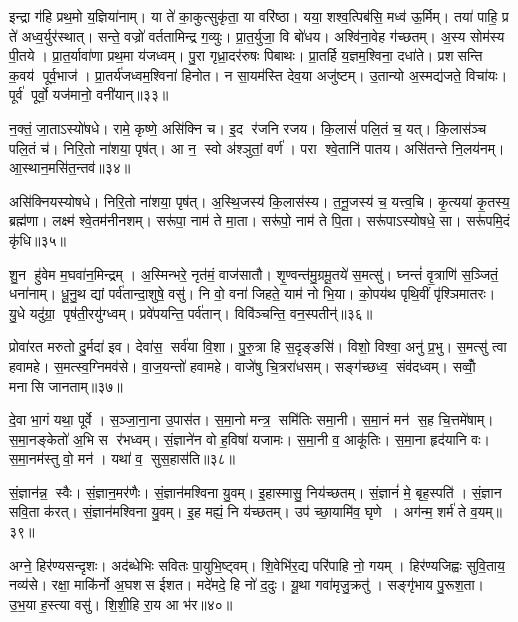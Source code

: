 इन्द्रा ग॑हि प्रथ॒मो य॒ज्ञिया॑नाम्।
या ते॑ का॒कुत्सुकृ॑ता॒ या वरि॑ष्ठा।
यया॒ शश्व॒त्पिब॑सि॒ मध्व॑ ऊ॒र्मिम्।
तया॑ पाहि॒ प्र ते॑ अध्व॒र्युर॑स्थात्।
सन्ते॒ वज्रो॑ वर्ततामिन्द्र ग॒व्युः।
प्रा॒त॒र्युजा॒ वि बो॑धय।
अश्वि॑ना॒वेह ग॑च्छतम्।
अ॒स्य सोम॑स्य पी॒तये।
प्रा॒त॒र्यावा॑णा प्रथ॒मा य॑जध्वम्।
पु॒रा गृध्रा॒दर॑रुषः पिबाथः।
प्रा॒तर्\mbox{}हि य॒ज्ञम॒श्विना॒ दधा॑ते।
प्रशसन्ति क॒वय॑ पूर्व॒भाज॑।
प्रा॒तर्य॑जध्वम॒श्विना॑ हिनोत।
न सा॒यम॑स्ति देव॒या अजु॑ष्टम्।
उ॒तान्यो अ॒स्मद्य॑जते॒ विचा॑यः।
पूर्व॑ पूर्वो॒ यज॑मानो॒ वनी॑यान्॥३३॥\anuvakamend[चा॒श्व॒जिद्यो ग॑च्छतं नो॒ दाश॒न्नामा॑भि॒श्रीर्ग॑मेम स॒प्रथा॑ भजामहे विशन्तु या॒ह्य॑र्वाङच्छ॑ पिबाथ॒ष्षट्च॑]

न॒क्तं॒ जा॒ताऽस्यो॑षधे।
रामे॒ कृष्णे॒ असि॑क्नि च।
इ॒द र॑जनि रजय।
कि॒लासं॑ पलि॒तं च॒ यत्।
कि॒लास॑ञ्च पलि॒तं च॑।
निरि॒तो ना॑शया॒ पृष॑त्।
आ न॒ स्वो अ॑श्ञुतां॒ वर्ण॑।
परा श्वे॒तानि॑ पातय।
असि॑तन्ते नि॒लय॑नम्।
आ॒स्थान॒मसि॑त॒न्तव॑॥३४॥

असि॑क्नियस्योषधे।
निरि॒तो ना॑शया॒ पृष॑त्।
अ॒स्थि॒जस्य॑ कि॒लास॑स्य।
त॒नू॒जस्य॑ च॒ यत्त्व॒चि।
कृ॒त्यया॑ कृ॒तस्य॒ ब्रह्म॑णा।
लक्ष्म॑ श्वे॒तम॑नीनशम्।
सरू॑पा॒ नाम॑ ते मा॒ता।
सरू॑पो॒ नाम॑ ते पि॒ता।
सरू॑पाऽस्योषधे॒ सा।
सरू॑पमि॒दं कृ॑धि॥३५॥

शु॒न हु॑वेम म॒घवा॑न॒मिन्द्रम्।
अ॒स्मिन्भरे॒ नृत॑मं॒ वाज॑सातौ।
शृ॒ण्वन्त॑मु॒ग्रमू॒तये॑ स॒मत्सु॑।
घ्नन्तं॑ वृ॒त्राणि॑ स॒ञ्जितं॒ धना॑नाम्।
धू॒नु॒थ द्यां पर्व॑तान्दा॒शुषे॒ वसु॑।
नि वो॒ वना॑ जिहते॒ याम॑ नो भि॒या।
को॒पय॑थ पृथि॒वीं पृ॑श्ञिमातरः।
यु॒धे यदु॑ग्रा॒ पृष॑ती॒रयु॑ग्ध्वम्।
प्रवे॑पयन्ति॒ पर्व॑तान्।
विवि॑ञ्चन्ति॒ वन॒स्पतीन्॑॥३६॥

प्रोवा॑रत मरुतो दु॒र्मदा॑ इव।
देवा॑स॒ सर्व॑या वि॒शा।
पु॒रु॒त्रा हि स॒दृङ्ङसि॑।
विशो॒ विश्वा॒ अनु॑ प्र॒भु।
स॒मत्सु॑ त्वा हवामहे।
स॒मत्स्व॒ग्निमव॑से।
वा॒ज॒यन्तो॑ हवामहे।
वाजे॑षु चि॒त्ररा॑धसम्।
सङ्ग॑च्छध्व॒ संव॑दध्वम्।
सव्वोँ॒ मनासि जानताम्॥३७॥

दे॒वा भा॒गं यथा॒ पूर्वे।
स॒ञ्जा॒ना॒ना उ॒पास॑त।
स॒मा॒नो मन्त्र॒ समि॑तिः समा॒नी।
स॒मा॒नं मन॑ स॒ह चि॒त्तमे॑षाम्।
स॒मा॒नङ्केतो॑ अ॒भि स र॑भध्वम्।
सं॒ज्ञाने॑न वो ह॒विषा॑ यजामः।
स॒मा॒नी व॒ आकू॑तिः।
स॒मा॒ना हृद॑यानि वः।
स॒मा॒नम॑स्तु वो॒ मन॑।
यथा॑ व॒ सुस॒हास॑ति॥३८॥

सं॒ज्ञान॑न्न॒ स्वैः।
सं॒ज्ञान॒मर॑णैः।
सं॒ज्ञान॑मश्विना यु॒वम्।
इ॒हास्मासु॒ निय॑च्छतम्।
सं॒ज्ञानं॑ मे॒ बृह॒स्पति॑।
सं॒ज्ञान सवि॒ता क॑रत्।
सं॒ज्ञान॑मश्विना यु॒वम्।
इ॒ह मह्यं॒ नि य॑च्छतम्।
उप॑ च्छा॒यामि॑व॒ घृणे।
अग॑न्म॒ शर्म॑ ते व॒यम्॥३९॥

अग्ने॒ हिर॑ण्यसन्दृशः।
अद॑ब्धेभिः सवितः पा॒युभि॒ष्ट्वम्।
शि॒वेभि॑र॒द्य परि॑पाहि नो॒ गयम्।
हिर॑ण्यजिह्वः सुवि॒ताय॒ नव्य॑से।
रक्षा॒ माकि॑र्नो अ॒घशस ईशत।
मदे॑मदे॒ हि नो॑ द॒दुः।
यू॒था गवा॑मृजु॒क्रतु॑।
सङ्गृ॑भाय पु॒रूश॒ता।
उ॒भ॒या ह॒स्त्या वसु॑।
शि॒शी॒हि रा॒य आ भ॑र॥४०॥

